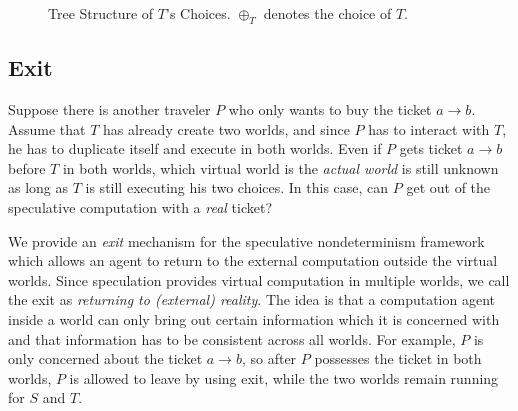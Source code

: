 \begin{figure}[tb]
\caption{Tree Structure of $T$'s Choices. $\oplus_T$ denotes the choice of $T$.}\label{fig:intro-speculate}
\end{figure}

\subsection{Exit}

Suppose there is another traveler $P$ who only wants to buy the ticket $a\to b$. 
Assume that $T$ has already create two worlds, and since $P$ has to interact
with $T$, he has to duplicate itself and execute in both worlds.
Even if $P$ gets ticket $a\to b$ before $T$ in both worlds, 
which virtual world is the {\em actual world} is still unknown
as long as $T$ is still executing his two choices. In this case,
can $P$ get out of the speculative computation with a {\em real} ticket? 
 
% 
We provide an {\em exit} mechanism for the speculative nondeterminism framework
which allows an agent to return to the external computation outside
the virtual worlds.
Since speculation provides virtual computation in multiple worlds,
we call the exit as {\em returning to (external) reality}.
The idea is that a computation agent inside a world can
only bring out certain information which it is concerned with and
that information has to be consistent across all worlds.
For example, $P$ is only concerned about the ticket $a\to b$, 
so after $P$ possesses the ticket in both worlds, 
$P$ is allowed to leave by using exit, while 
the two worlds remain running for $S$ and $T$.

